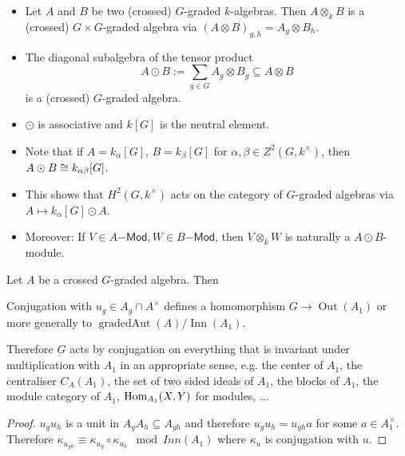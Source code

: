 \begin{example}
\begin{itemize}
\item  Let $A$ and $B$ be two (crossed) $G$-graded $k$-algebras. Then $A\otimes_k B$ is a (crossed) $G\times G$-graded algebra via $(A\otimes B)_{g,h} = A_g\otimes B_h$.

\item The diagonal subalgebra of the tensor product
\[A \odot B := \sum_{g\in G} A_g\otimes B_g \subseteq A\otimes B\]
is a (crossed) $G$-graded algebra.

\item $\odot$ is associative and $k[G]$ is the neutral element.

\item Note that if $A=k_\alpha[G]$, $B=k_\beta[G]$ for $\alpha,\beta\in Z^2(G,k^\times)$, then $A\odot B \cong k_{\alpha\beta}[G]$.

\item This shows that $H^2(G,k^\times)$ acts on the category of $G$-graded algebras via $A\mapsto k_\alpha[G] \odot A$.

\item Moreover: If $V\in A\mathsf{-Mod}, W\in B\mathsf{-Mod}$, then $V \otimes_k W$ is naturally a $A\odot B$-module.
\end{itemize}
\end{example}

\begin{proposition}
Let $A$ be a crossed $G$-graded algebra. Then

Conjugation with $u_g\in A_g\cap A^\times$ defines a homomorphism $G\to \operatorname{Out}(A_1)$ or more generally to $\operatorname{gradedAut}(A)/\operatorname{Inn}(A_1)$.

Therefore $G$ acts by conjugation on everything that is invariant under multiplication with $A_1$ in an appropriate sense, e.g. the center of $A_1$, the centraliser $C_A(A_1)$, the set of two sided ideals of $A_1$, the blocks of $A_1$, the module category of $A_1$, $\operatorname{Hom}_{A_1}(X,Y)$ for modules, ...
\end{proposition}
\begin{proof}
$u_g u_h$ is a unit in $A_g A_h\subseteq A_{gh}$ and therefore $u_g u_h=u_{gh} a$ for some $a\in A_1^\times$. Therefore $\kappa_{u_{gh}} \equiv \kappa_{u_g}\circ\kappa_{u_h} \mod Inn(A_1)$ where $\kappa_u$ is conjugation with $u$.
\end{proof}